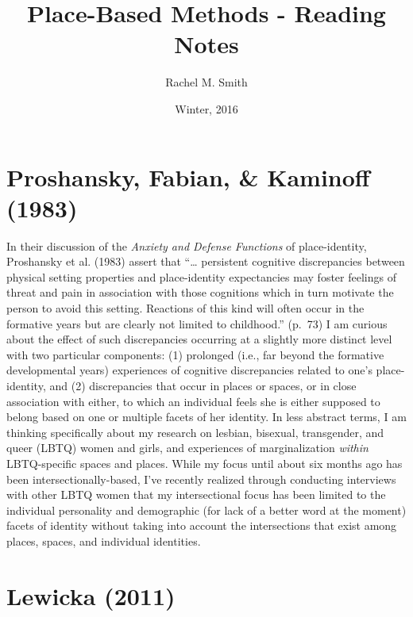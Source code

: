 \documentclass[11pt,]{tufte-handout}
\title{Place-Based Methods - Reading Notes}
\author{Rachel M. Smith}
\date{Winter, 2016}
\begin{document}
\maketitle



{
\setcounter{tocdepth}{1}
\tableofcontents
}

\section{Proshansky, Fabian, \& Kaminoff
(1983)}\label{proshansky1983place}

In their discussion of the \emph{Anxiety and Defense Functions} of
place-identity, Proshansky et al. (1983) assert that ``\ldots{}
persistent cognitive discrepancies between physical setting properties
and place-identity expectancies may foster feelings of threat and pain
in association with those cognitions which in turn motivate the person
to avoid this setting. Reactions of this kind will often occur in the
formative years but are clearly not limited to childhood.'' (p.~73) I am
curious about the effect of such discrepancies occurring at a slightly
more distinct level with two particular components: (1) prolonged (i.e.,
far beyond the formative developmental years) experiences of cognitive
discrepancies related to one's place-identity, and (2) discrepancies
that occur in places or spaces, or in close association with either, to
which an individual feels she is either supposed to belong based on one
or multiple facets of her identity. In less abstract terms, I am
thinking specifically about my research on lesbian, bisexual,
transgender, and queer (LBTQ) women and girls, and experiences of
marginalization \emph{within} LBTQ-specific spaces and places. While my
focus until about six months ago has been intersectionally-based, I've
recently realized through conducting interviews with other LBTQ women
that my intersectional focus has been limited to the individual
personality and demographic (for lack of a better word at the moment)
facets of identity without taking into account the intersections that
exist among places, spaces, and individual identities.

\section{Lewicka (2011)}\label{lewicka2011place}
\end{document}
